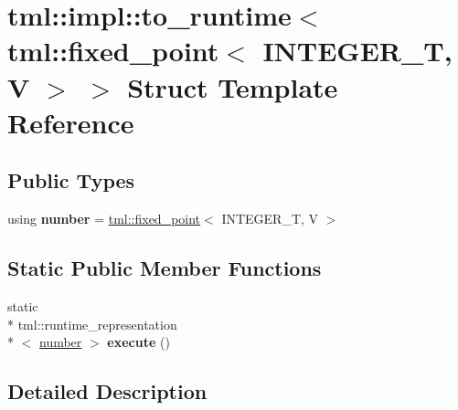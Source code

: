 \hypertarget{structtml_1_1impl_1_1to__runtime_3_01tml_1_1fixed__point_3_01_i_n_t_e_g_e_r___t_00_01_v_01_4_01_4}{\section{tml\+:\+:impl\+:\+:to\+\_\+runtime$<$ tml\+:\+:fixed\+\_\+point$<$ I\+N\+T\+E\+G\+E\+R\+\_\+\+T, V $>$ $>$ Struct Template Reference}
\label{structtml_1_1impl_1_1to__runtime_3_01tml_1_1fixed__point_3_01_i_n_t_e_g_e_r___t_00_01_v_01_4_01_4}
}
\subsection*{Public Types}
\begin{DoxyCompactItemize}
\item 
\hypertarget{structtml_1_1impl_1_1to__runtime_3_01tml_1_1fixed__point_3_01_i_n_t_e_g_e_r___t_00_01_v_01_4_01_4_ae0f7c21b5dd9fa8ce13d713928b4df5a}{using {\bfseries number} = \hyperlink{structtml_1_1fixed__point}{tml\+::fixed\+\_\+point}$<$ I\+N\+T\+E\+G\+E\+R\+\_\+\+T, V $>$}\label{structtml_1_1impl_1_1to__runtime_3_01tml_1_1fixed__point_3_01_i_n_t_e_g_e_r___t_00_01_v_01_4_01_4_ae0f7c21b5dd9fa8ce13d713928b4df5a}

\end{DoxyCompactItemize}
\subsection*{Static Public Member Functions}
\begin{DoxyCompactItemize}
\item 
\hypertarget{structtml_1_1impl_1_1to__runtime_3_01tml_1_1fixed__point_3_01_i_n_t_e_g_e_r___t_00_01_v_01_4_01_4_aa4fe23243936c20f2a43dbe46a54d74f}{static \\*
tml\+::runtime\+\_\+representation\\*
$<$ \hyperlink{structtml_1_1fixed__point}{number} $>$ {\bfseries execute} ()}\label{structtml_1_1impl_1_1to__runtime_3_01tml_1_1fixed__point_3_01_i_n_t_e_g_e_r___t_00_01_v_01_4_01_4_aa4fe23243936c20f2a43dbe46a54d74f}

\end{DoxyCompactItemize}


\subsection{Detailed Description}
